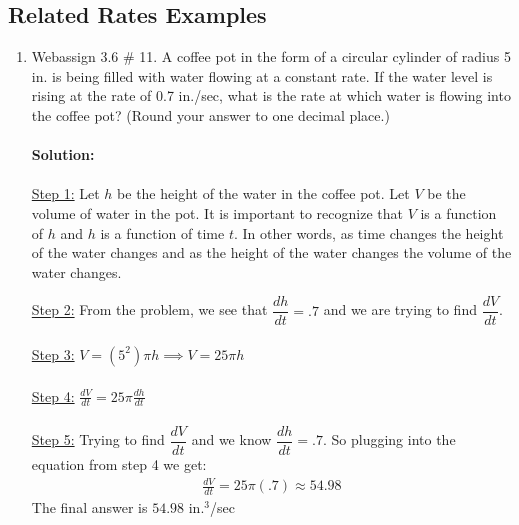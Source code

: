 \documentclass[reqno,psamsfonts]{amsart}
\theoremstyle{definition}
\theoremstyle{remark}
\numberwithin{equation}{section}
\begin{document}
\subsection*{Related Rates Examples}
\begin{enumerate}
\vspace{1em}
\item Webassign 3.6 \# 11. A coffee pot in the form of a circular cylinder of radius 5 in. is being filled with water flowing at a constant rate. If the water level is rising at the rate of 0.7 in./sec, what is the rate at which water is flowing into the coffee pot? (Round your answer to one decimal place.)
\\
\\\textbf{Solution:} 
\\
\\
\underline{Step 1:}
Let $h$ be the height of the water in the coffee pot. Let $V$ be the volume of water in the pot. It is important to recognize that $V$ is a function of $h$ and $h$ is a function of time $t$. In other words, as time changes the height of the water changes and as the height of the water changes the volume of the water changes. 
\begin{center}
\end{center}
\vspace{2em}
\underline{Step 2:}  From the problem, we see that $\dfrac{dh}{dt}=.7$ and we are trying to find $\dfrac{dV}{dt}$. 
\\
\\
\underline{Step 3:} $V=(5^2)\pi h\implies V=25\pi h$
\\
\\
\underline{Step 4:} $\frac{dV}{dt}=25\pi \frac{dh}{dt}$
\\
\\
\underline{Step 5:} Trying to find $\dfrac{dV}{dt}$ and we know $\dfrac{dh}{dt}=.7$. So plugging into the equation from step 4 we get:
\begin{align*}
\frac{dV}{dt}=25\pi (.7)\approx 54.98
\end{align*}
The final answer is $54.98$ in.$^3$/sec
\\


\end{enumerate}
\end{document}
